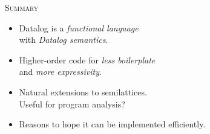 \documentclass[aspectratio=2013,dvipsnames,fleqn]{beamer}
\begin{document}

\begin{frame}{\scshape Summary}
  \begin{itemize}\setlength\itemsep{1.5ex}
  \item Datalog is a \emph{functional language}\\with \emph{Datalog semantics}.

  \item Higher-order code for
    \emph{less boilerplate}\\ and
    \emph{more expressivity}.

  \item Natural extensions to semilattices.\\
    Useful for program analysis?

  \item Reasons to hope it can be implemented efficiently.

  \end{itemize}
  \vfill
\end{frame}
\end{document}
